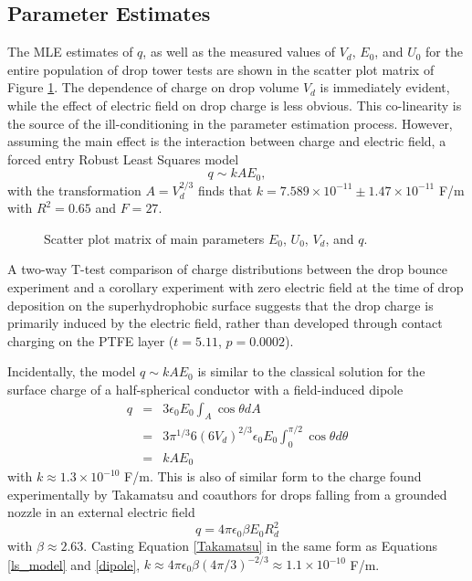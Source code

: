 \documentclass[aip,reprint, floatfix]{revtex4-1}
\begin{document}
\subsection{Parameter Estimates}
The MLE estimates of $q$, as well as the measured values of $V_d$, $E_0$, and $U_0$ for the entire population of drop tower tests are shown in the scatter plot matrix of Figure \ref{fig:scatter}. The dependence of charge on drop volume $V_d$ is immediately evident, while the effect of electric field on drop charge is less obvious. This co-linearity is the source of the ill-conditioning in the parameter estimation process. However, assuming the main effect is the interaction between charge and electric field, a forced entry Robust Least Squares model 
\begin{equation}
q \sim kAE_0,
\label{ls_model}
\end{equation} 
with the transformation $A = V_d^{2/3}$ finds that $k=7.589 \times 10^{-11} \pm  1.47 \times 10^{-11}$ F/m with $R^2 = 0.65$ and $F=27$. 
\begin{figure}[h]
    \centering
    \resizebox{0.5\textwidth}{!}{}
    \caption{Scatter plot matrix of main parameters $E_0$, $U_0$, $V_d$, and $q$.\label{fig:scatter}}
\end{figure}

A two-way T-test comparison of charge distributions between the drop bounce experiment and a corollary experiment with zero electric field at the time of drop deposition on the superhydrophobic surface suggests that the drop charge is primarily induced by the electric field, rather than developed through contact charging on the PTFE layer ($t = 5.11$, $p = 0.0002$).

Incidentally, the model $q \sim kAE_0$ is similar to the classical solution for the surface charge of a half-spherical conductor with a field-induced dipole \cite{david_j._griffiths_introduction_1999}
\begin{eqnarray}
q &=& 3 \epsilon_0 E_0 \int_A \cos \theta dA \nonumber \\
&=& 3 \pi^{1/3} 6 \left(6 V_d \right)^{2/3} \epsilon_0 E_0 \int^{\pi / 2}_{0} \!\!\!\!\! \cos \theta d\theta \nonumber \\
&=& k A E_0 \label{dipole}
\end{eqnarray}
with $k \approx 1.3 \times 10^{-10}$ F/m. This is also of similar form to the charge found experimentally by Takamatsu and coauthors for drops falling from a grounded nozzle in an external electric field \cite{takamatsu_theoretical_1981}
\begin{equation}
q = 4 \pi \epsilon_0 \beta E_0 R_d^2
\label{Takamatsu}
\end{equation}
with $\beta \approx 2.63$. Casting Equation \ref{Takamatsu} in the same form as Equations \ref{ls_model} and \ref{dipole}, $k \approx 4 \pi \epsilon_0 \beta (4 \pi/3)^{-2/3} \approx 1.1 \times 10^{-10}$ F/m.
\end{document}
